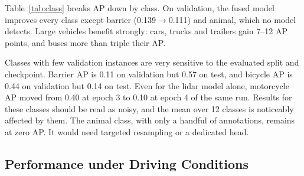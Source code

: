 \documentclass[conference]{IEEEtran}
\begin{document}
Table~\ref{tab:class} breaks AP down by class. On validation, the fused model improves every class except barrier
(0.139$\rightarrow$0.111) and animal, which no model detects. Large vehicles benefit strongly: cars, trucks and
trailers gain 7--12 AP points, and buses more than triple their AP. 

Classes with few validation instances are very sensitive to the evaluated split and checkpoint. Barrier AP is 0.11
on validation but 0.57 on test, and bicycle AP is 0.44 on validation but 0.14 on test. Even for the lidar model
alone, motorcycle AP moved from 0.40 at epoch 3 to 0.10 at epoch 4 of the same run. Results for these classes should
be read as noisy, and the mean over 12 classes is noticeably affected by them. The animal class, with only a handful of
annotations, remains at zero AP. It would need targeted resampling or a dedicated head.

\subsection{Performance under Driving Conditions}
\end{document}

